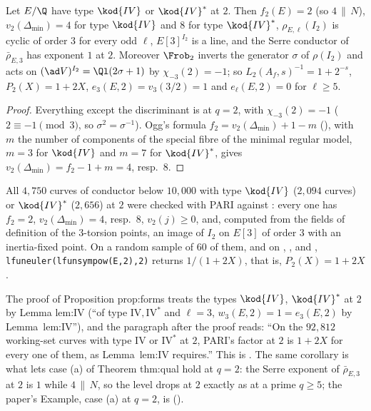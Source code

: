 \begin{corollary}\label{cor:galrep:IV-at-2}
Let $E/\Q$ have type $\kod{IV}$ or $\kod{IV}^*$ at $2$. Then $f_2(E)=2$ (so $4\,\|\,N$), $v_2(\Delta_{\min})=4$ for type $\kod{IV}$ and $8$ for type $\kod{IV}^*$, $\rho_{E,\ell}(I_2)$ is
cyclic of order $3$ for every odd $\ell$, $E[3]^{I_2}$ is a line, and the Serre conductor of $\bar\rho_{E,3}$ has exponent $1$ at $2$. Moreover $\Frob_2$ inverts
the generator $\sigma$ of $\rho(I_2)$ and acts on $(\ad V)^{I_2}=\Ql(2\sigma+1)$ by $\chi_{-3}(2)=-1$; so $L_2(A_f,s)^{-1}=1+2^{-s}$, $P_2(X)=1+2X$, $e_3(E,2)=v_3(3/2)=1$
and $e_\ell(E,2)=0$ for $\ell\ge5$.
\end{corollary}

\begin{proof}
Everything except the discriminant is  at $q=2$, with $\chi_{-3}(2)=-1$ ($2\equiv-1\pmod3$, so $\sigma^2=\sigma^{-1}$). Ogg's formula
$f_2=v_2(\Delta_{\min})+1-m$ (), with $m$ the number of components of the special fibre of the minimal regular model, $m=3$ for
$\kod{IV}$ and $m=7$ for $\kod{IV}^*$, gives $v_2(\Delta_{\min})=f_2-1+m=4$, resp.\ $8$.
\end{proof}

All $4{,}750$ curves of conductor below $10{,}000$ with type $\kod{IV}$ ($2{,}094$ curves) or $\kod{IV}^*$ ($2{,}656$) at $2$ were checked with PARI against
: every one has $f_2=2$, $v_2(\Delta_{\min})=4$, resp.\ $8$, $v_2(j)\ge0$, and, computed from the fields of definition of the
$3$-torsion points, an image of $I_2$ on $E[3]$ of order $3$ with an inertia-fixed point. On a random sample of $60$ of them, and on ,
,  and , \texttt{lfuneuler(lfunsympow(E,2),2)} returns $1/(1+2X)$, that is, $P_2(X)=1+2X$.

\begin{paperlink}
The proof of Proposition prop:forms treats the types $\kod{IV}$, $\kod{IV}^*$ at $2$ by Lemma lem:IV (``of type $\mathrm{IV},\mathrm{IV}^*$ and
$\ell=3$, $w_3(E,2)=1=e_3(E,2)$ by Lemma~lem:IV''), and the paragraph after the proof reads: ``On the $92{,}812$ working-set curves with type
$\mathrm{IV}$ or $\mathrm{IV}^*$ at $2$, PARI's factor at $2$ is $1+2X$ for every one of them, as Lemma~lem:IV requires.'' This is . The same corollary is what lets case
(a) of Theorem thm:qual hold at $q=2$: the Serre exponent of $\bar\rho_{E,3}$ at $2$ is $1$ while $4\,\|\,N$, so the level drops at $2$ exactly as at a prime
$q\ge5$; the paper's Example, case (a) at $q=2$, is  ().
\end{paperlink}


